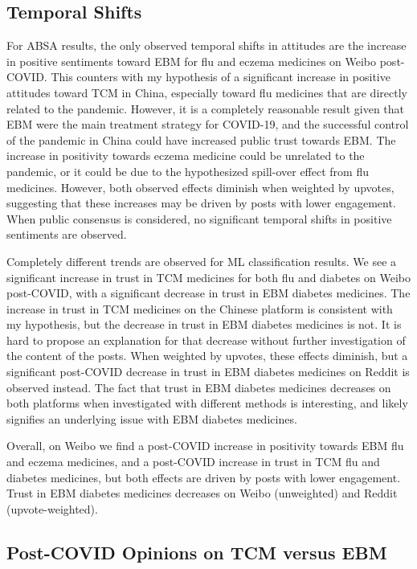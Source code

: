 \documentclass[11pt]{article}
\begin{document}
\subsection{Temporal Shifts}

For ABSA results, the only observed temporal shifts in attitudes are the increase in positive sentiments toward EBM for flu and eczema medicines on Weibo post-COVID. This counters with my hypothesis of a significant increase in positive attitudes toward TCM in China, especially toward flu medicines that are directly related to the pandemic. However, it is a completely reasonable result given that EBM were the main treatment strategy for COVID-19, and the successful control of the pandemic in China could have increased public trust towards EBM. The increase in positivity towards eczema medicine could be unrelated to the pandemic, or it could be due to the hypothesized spill-over effect from flu medicines. However, both observed effects diminish when weighted by upvotes, suggesting that these increases may be driven by posts with lower engagement. When public consensus is considered, no significant temporal shifts in positive sentiments are observed.

Completely different trends are observed for ML classification results. We see a significant increase in trust in TCM medicines for both flu and diabetes on Weibo post-COVID, with a significant decrease in trust in EBM diabetes medicines. The increase in trust in TCM medicines on the Chinese platform is consistent with my hypothesis, but the decrease in trust in EBM diabetes medicines is not. It is hard to propose an explanation for that decrease without further investigation of the content of the posts. When weighted by upvotes, these effects diminish, but a significant post-COVID decrease in trust in EBM diabetes medicines on Reddit is observed instead. The fact that trust in EBM diabetes medicines decreases on both platforms when investigated with different methods is interesting, and likely signifies an underlying issue with EBM diabetes medicines.

Overall, on Weibo we find a post-COVID increase in positivity towards EBM flu and eczema medicines, and a post-COVID increase in trust in TCM flu and diabetes medicines, but both effects are driven by posts with lower engagement. Trust in EBM diabetes medicines decreases on Weibo (unweighted) and Reddit (upvote-weighted).

\subsection{Post-COVID Opinions on TCM versus EBM}
\end{document}
